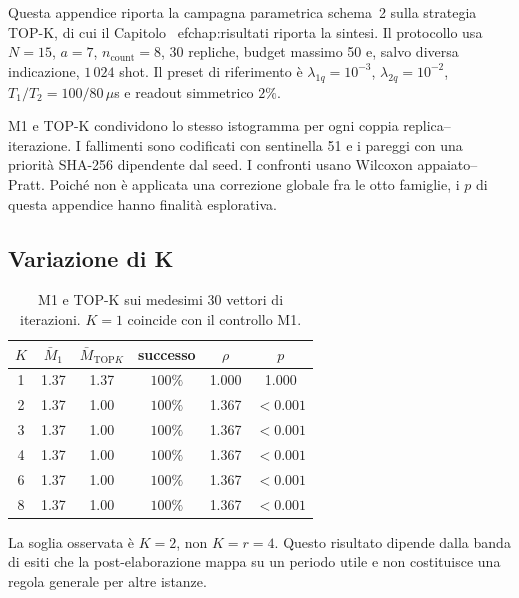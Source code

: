 \begin{onehalfspace}

Questa appendice riporta la campagna parametrica schema~2 sulla
strategia TOP-K, di cui il Capitolo~
ef{chap:risultati} riporta la sintesi. Il protocollo usa $N=15$, $a=7$,
$n_{\mathrm{count}}=8$, 30 repliche, budget massimo 50 e, salvo diversa
indicazione, $1\,024$ shot. Il preset di riferimento è
$\lambda_{1q}=10^{-3}$, $\lambda_{2q}=10^{-2}$,
$T_1/T_2=100/80\,\mu$s e readout simmetrico $2\%$.

M1 e TOP-K condividono lo stesso istogramma per ogni coppia
replica--iterazione. I fallimenti sono codificati con sentinella 51 e i
pareggi con una priorità SHA-256 dipendente dal seed. I confronti usano
Wilcoxon appaiato--Pratt. Poiché non è applicata una correzione globale
fra le otto famiglie, i $p$ di questa appendice hanno finalità
esplorativa.

\subsection{Variazione di K}
\label{subsec:sweep_k}

\begin{table}[H]
\centering
\caption[Sweep del numero di candidati]{M1 e TOP-K sui medesimi 30
vettori di iterazioni. $K=1$ coincide con il controllo M1.}
\label{tab:sweep_k}
\begin{tabular}{cccccc}
\toprule
$K$ & $\bar M_1$ & $\bar M_{\mathrm{TOP}K}$ & successo & $\rho$ & $p$ \\
\midrule
1 & 1.37 & 1.37 & $100\%$ & 1.000 & 1.000 \\
2 & 1.37 & 1.00 & $100\%$ & 1.367 & $<0.001$ \\
3 & 1.37 & 1.00 & $100\%$ & 1.367 & $<0.001$ \\
4 & 1.37 & 1.00 & $100\%$ & 1.367 & $<0.001$ \\
6 & 1.37 & 1.00 & $100\%$ & 1.367 & $<0.001$ \\
8 & 1.37 & 1.00 & $100\%$ & 1.367 & $<0.001$ \\
\bottomrule
\end{tabular}
\end{table}

La soglia osservata è $K=2$, non $K=r=4$. Questo risultato dipende
dalla banda di esiti che la post-elaborazione mappa su un periodo utile e
non costituisce una regola generale per altre istanze.


\end{onehalfspace}
